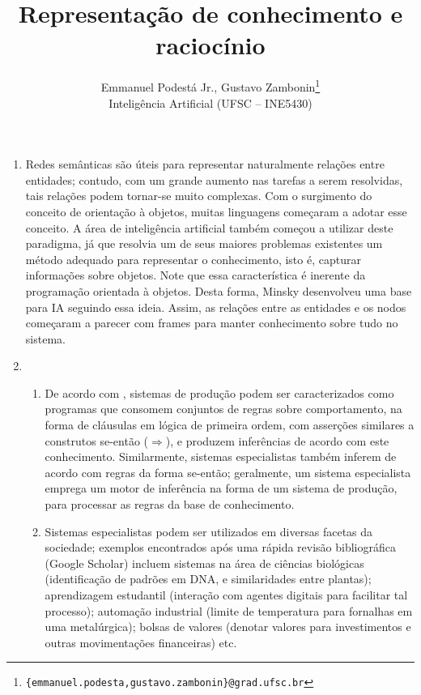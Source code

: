 \documentclass{article}
\title{\textbf{Representação de conhecimento e raciocínio}}
\author{Emmanuel Podestá Jr., Gustavo Zambonin\thanks{
    \texttt{\{emmanuel.podesta,gustavo.zambonin\}@grad.ufsc.br}} \\
\small {Inteligência Artificial (UFSC -- INE5430)} \vspace{-5mm}}
\date{}
\begin{document}
\maketitle

\begin{enumerate}[label=\textbf{\arabic*})]

    \item Redes semânticas são úteis para representar naturalmente relações
        entre entidades; contudo, com um grande aumento nas tarefas a serem
        resolvidas, tais relações podem tornar-se muito complexas. Com o
        surgimento do conceito de orientação à objetos, muitas linguagens
        começaram a adotar esse conceito. A área de inteligência artificial
        também começou a utilizar deste paradigma, já que resolvia um de seus
        maiores problemas existentes um método adequado para representar o
        conhecimento, isto é, capturar informações sobre objetos. Note que
        essa característica é inerente da programação orientada à objetos.
        Desta forma, Minsky \cite{1975:MFS:980190.980222} desenvolveu uma
        base para IA seguindo essa ideia. Assim, as relações entre as
        entidades e os nodos começaram a parecer com frames para manter
        conhecimento sobre tudo no sistema.

    \item

        \begin{enumerate}

            \item De acordo com \cite[p. 23, 336]{Russell:2009:AIM:1671238},
                sistemas de produção podem ser caracterizados como programas
                que consomem conjuntos de regras sobre comportamento, na forma
                de cláusulas em lógica de primeira ordem, com asserções
                similares a construtos se-então ($\Rightarrow$), e produzem
                inferências de acordo com este conhecimento. Similarmente,
                sistemas especialistas também inferem de acordo com regras da
                forma se-então; geralmente, um sistema especialista emprega um
                motor de inferência na forma de um sistema de produção, para
                processar as regras da base de conhecimento.

            \item Sistemas especialistas podem ser utilizados em diversas
                facetas da sociedade; exemplos encontrados após uma rápida
                revisão bibliográfica (Google Scholar) incluem sistemas na
                área de ciências biológicas (identificação de padrões em DNA,
                e similaridades entre plantas); aprendizagem estudantil
                (interação com agentes digitais para facilitar tal processo);
                automação industrial (limite de temperatura para fornalhas em
                uma metalúrgica); bolsas de valores (denotar valores para
                investimentos e outras movimentações financeiras) etc.


\end{enumerate}
\end{enumerate}
\end{document}
